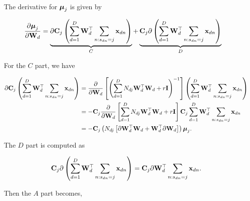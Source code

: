 	The derivative for $\boldsymbol{\mu}_j$ is given by
	
	\begin{align}
	\frac{\partial \boldsymbol{\mu}_j}{\partial \mathbf{W}_d} &= \underbrace{\partial\mathbf{C}_j\left(\sum_{d=1}^{D}\mathbf{W}_d^\top\sum_{n:s_{dn}=j}\mathbf{x}_{dn}\right)}_{C} + \underbrace{\mathbf{C}_j\partial\left(\sum_{d=1}^{D}\mathbf{W}_d^\top\sum_{n:s_{dn}=j}\mathbf{x}_{dn}\right)}_{D} 
	\end{align}
	
	For the $C$ part, we have
	
	\begin{align}
	\partial\mathbf{C}_j\left(\sum_{d=1}^{D}\mathbf{W}_d^\top\sum_{n:s_{dn}=j}\mathbf{x}_{dn}\right) &= \frac{\partial}{\partial \mathbf{W}_d}\left[\left(\sum_{d=1}^{D}N_{dj}\mathbf{W}_d^\top\mathbf{W}_d+r\mathbf{I}\right)^{-1}\right]\left(\sum_{d=1}^{D}\mathbf{W}_d^\top\sum_{n:s_{dn}=j}\mathbf{x}_{dn}\right) \notag \\
	&= -\mathbf{C}_j \frac{\partial}{\partial \mathbf{W}_d}\left[\sum_{d=1}^{D}N_{dj}\mathbf{W}_d^\top\mathbf{W}_d+r\mathbf{I}\right]\mathbf{C}_j\sum_{d=1}^{D}\mathbf{W}_d^\top\sum_{n:s_{dn}=j}\mathbf{x}_{dn} \notag\\
	&=-\mathbf{C}_j\left(N_{dj}\left[\partial\mathbf{W}_d^\top\mathbf{W}_d+\mathbf{W}_d^\top\partial\mathbf{W}_d\right]\right)\boldsymbol{\mu}_j.
	\end{align}
	
	The $D$ part is computed as
	
	\begin{align}
	\mathbf{C}_j\partial\left(\sum_{d=1}^{D}\mathbf{W}_d^\top\sum_{n:s_{dn}=j}\mathbf{x}_{dn}\right) = \mathbf{C}_j\partial\mathbf{W}_d^\top\sum_{n:s_{dn}=j}\mathbf{x}_{dn}.
	\end{align}
	
	Then the $A$ part becomes,
	
